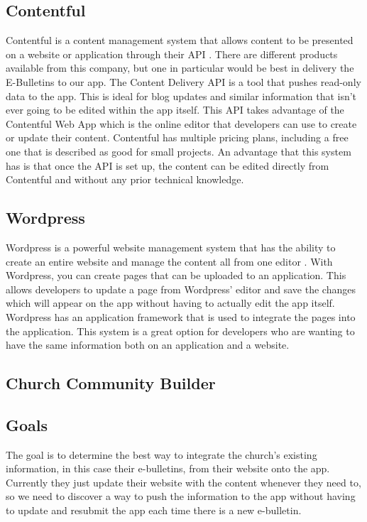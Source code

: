 \documentclass[letterpaper,10pt,draftclsnofoot,onecolumn,titlepage]{IEEEtran}
\begin{document}
	\subsection{Contentful}
	Contentful is a content management system that allows content to be presented on a website or application through their API \cite{Contentful}. 
	There are different products available from this company, but one in particular would be best in delivery the E-Bulletins to our app. 
	The Content Delivery API is a tool that pushes read-only data to the app. 
	This is ideal for blog updates and similar information that isn't ever going to be edited within the app itself. 
	This API takes advantage of the Contentful Web App which is the online editor that developers can use to create or update their content. 
	Contentful has multiple pricing plans, including a free one that is described as good for small projects.
	An advantage that this system has is that once the API is set up, the content can be edited directly from Contentful and without any prior technical knowledge. 
	
	\subsection{Wordpress}
	Wordpress is a powerful website management system that has the ability to create an entire website and manage the content all from one editor \cite{Wordpress}. 
	With Wordpress, you can create pages that can be uploaded to an application.
	This allows developers to update a page from Wordpress' editor and save the changes which will appear on the app without having to actually edit the app itself. 
	Wordpress has an application framework that is used to integrate the pages into the application. 
	This system is a great option for developers who are wanting to have the same information both on an application and a website. 
	
	\subsection{Church Community Builder}
	\subsection{Goals}
	The goal is to determine the best way to integrate the church's existing information, in this case their e-bulletins, from their website onto the app. 
	Currently they just update their website with the content whenever they need to, so we need to discover a way to push the information to the app without having to update and resubmit the app each time there is a new e-bulletin. 
	 
\end{document}
